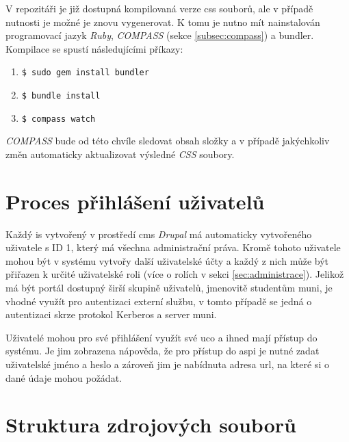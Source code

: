 V repozitáři je již dostupná kompilovaná verze \gls{css} souborů, ale v případě nutnosti je možné je znovu vygenerovat. K tomu je nutno mít nainstalován programovací jazyk \emph{Ruby}, \emph{COMPASS} (sekce \ref{subsec:compass}) a \gls{bundler}. Kompilace se spustí následujícími příkazy:

\begin{enumerate}
  \item \texttt{\$ sudo gem install bundler}
  \item \texttt{\$ bundle install}
  \item \texttt{\$ compass watch}
\end{enumerate}

\emph{COMPASS} bude od této chvíle sledovat obsah složky a v případě jakýchkoliv změn automaticky aktualizovat výsledné \emph{CSS} soubory.

\section{Proces přihlášení uživatelů}

Každý \gls{is} vytvořený v prostředí \gls{cms} \emph{Drupal} má automaticky vytvořeného uživatele s ID 1, který má všechna administrační práva. Kromě tohoto uživatele mohou být v systému vytvořy další uživatelské účty a každý z nich může být přiřazen k určité uživatelské roli (více o rolích v sekci \ref{sec:administrace}). Jelikož má být portál dostupný širší skupině uživatelů, jmenovitě studentům \gls{muni}, je vhodné využít pro autentizaci externí službu, v tomto případě se jedná o autentizaci skrze protokol Kerberos a server \gls{muni}. 

Uživatelé mohou pro své přihlášení využít své \gls{uco} a ihned mají přístup do systému. Je jim zobrazena nápověda, že pro přístup do \gls{aspi} je nutné zadat uživatelské jméno a heslo a zároveň jim je nabídnuta adresa \gls{url}, na které si o dané údaje mohou požádat. 

\section{Struktura zdrojových souborů}

